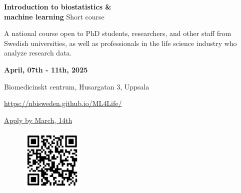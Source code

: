 \documentclass[12pt]{article}\usepackage[]{graphicx}\usepackage[]{color}
\begin{document}

\Huge
\textbf{Introduction to biostatistics \& \\machine learning} %
\Large
\newline
Short course

\vspace{1cm}
\Large
A national course open to PhD students, researchers, and other staff from Swedish universities, as well as professionals in the life science industry who analyze research data.

\LARGE
\vspace{0.5cm}
\textbf{April, 07th - 11th, 2025} %

\large
Biomedicinskt centrum,  Husargatan 3, Uppsala %



\Large

\href{https://nbisweden.github.io/ML4Life/}{https://nbisweden.github.io/ML4Life/}


\Large
 \href{https://nbisweden.github.io/ML4Life/}{Apply by March, 14th}

\vspace{0.5cm}
\begin{figure}[H]
 \begin{minipage}[c]{0.6\linewidth}
 \end{minipage}\hfill
 \begin{minipage}[c]{0.2\linewidth}
 \includegraphics[width=3cm, height=3cm, center]{QR-code.png}
 \end{minipage}
  
\end{figure}
\end{document}
